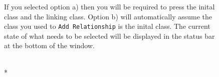 \documentclass[a4paper]{article}
\begin{document}
\begin{figure}[H]
If you selected option a) then you will be required to press the inital class and the linking class. Option b) will automatically assume the class you used to \texttt{Add Relationship} is the inital class. The current state of
what needs to be selected will be displayed in the status bar at the bottom of the window.
\begin{center}

 \imagespace
{}\\*

\end{center}
\end{figure}
\end{document}
